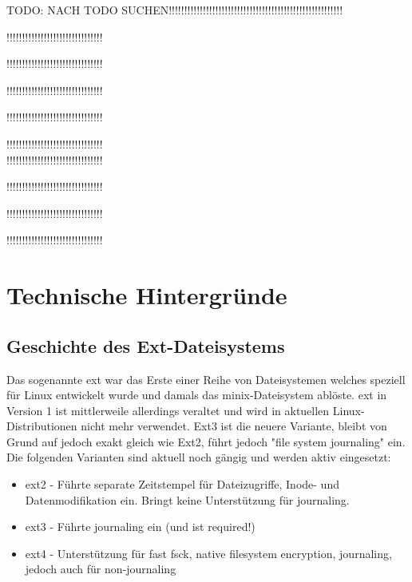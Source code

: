 

TODO: NACH TODO SUCHEN!!!!!!!!!!!!!!!!!!!!!!!!!!!!!!!!!!!!!!!!!!!!!!!!!!!!!!!!

!!!!!!!!!!!!!!!!!!!!!!!!!!!!!!!

!!!!!!!!!!!!!!!!!!!!!!!!!!!!!!!

!!!!!!!!!!!!!!!!!!!!!!!!!!!!!!!

!!!!!!!!!!!!!!!!!!!!!!!!!!!!!!!

!!!!!!!!!!!!!!!!!!!!!!!!!!!!!!!\\

!!!!!!!!!!!!!!!!!!!!!!!!!!!!!!!

!!!!!!!!!!!!!!!!!!!!!!!!!!!!!!!

!!!!!!!!!!!!!!!!!!!!!!!!!!!!!!!

!!!!!!!!!!!!!!!!!!!!!!!!!!!!!!!






\section{Technische Hintergründe}

\subsection{Geschichte des Ext-Dateisystems}


Das sogenannte \ac{ext} war das Erste einer Reihe von Dateisystemen welches speziell für Linux entwickelt wurde und damals das minix-Dateisystem ablöste. \ac{ext} in Version 1 ist mittlerweile allerdings veraltet und wird in aktuellen Linux-Distributionen nicht mehr verwendet. Ext3 ist die neuere Variante, bleibt von Grund auf jedoch exakt gleich wie Ext2, führt jedoch "file system journaling" ein. Die folgenden Varianten sind aktuell noch gängig und werden aktiv eingesetzt:

\begin{itemize}
	\item ext2 - Führte separate Zeitstempel für Dateizugriffe, Inode- und Datenmodifikation ein. Bringt keine Unterstützung für journaling.
	\item ext3 - Führte journaling ein (und ist required!)
	\item ext4 - Unterstützung für fast fsck, native filesystem encryption, journaling, jedoch auch für non-journaling
\end{itemize}

